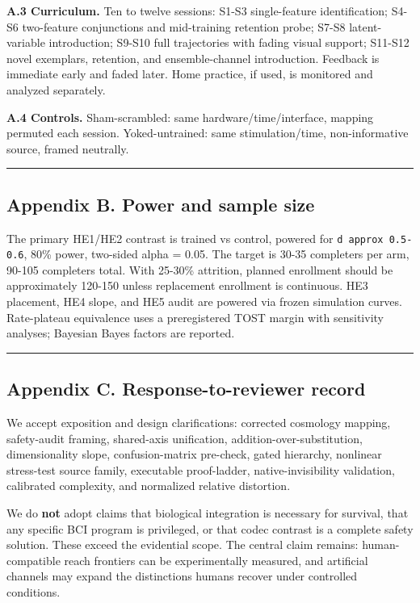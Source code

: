 \documentclass[
  11pt,
]{article}
\begin{document}
\textbf{A.3 Curriculum.} Ten to twelve sessions: S1-S3
single-feature identification; S4-S6 two-feature
conjunctions and mid-training retention probe; S7-S8
latent-variable introduction; S9-S10 full trajectories
with fading visual support; S11-S12 novel exemplars,
retention, and ensemble-channel introduction. Feedback
is immediate early and faded later. Home practice, if
used, is monitored and analyzed separately.

\textbf{A.4 Controls.} Sham-scrambled: same
hardware/time/interface, mapping permuted each session.
Yoked-untrained: same stimulation/time, non-informative
source, framed neutrally.

\begin{center}\rule{0.5\linewidth}{0.5pt}\end{center}

\subsection{Appendix B. Power and sample
size}\label{appendix-b.-power-and-sample-size}

The primary HE1/HE2 contrast is trained vs control,
powered for \texttt{d\ approx\ 0.5-0.6}, 80\% power,
two-sided alpha = 0.05. The target is 30-35 completers
per arm, 90-105 completers total. With 25-30\%
attrition, planned enrollment should be approximately
120-150 unless replacement enrollment is continuous.
HE3 placement, HE4 slope, and HE5 audit are powered via
frozen simulation curves. Rate-plateau equivalence uses
a preregistered TOST margin with sensitivity analyses;
Bayesian Bayes factors are reported.

\begin{center}\rule{0.5\linewidth}{0.5pt}\end{center}

\subsection{Appendix C. Response-to-reviewer
record}\label{appendix-c.-response-to-reviewer-record}

We accept exposition and design clarifications:
corrected cosmology mapping, safety-audit framing,
shared-axis unification, addition-over-substitution,
dimensionality slope, confusion-matrix pre-check, gated
hierarchy, nonlinear stress-test source family,
executable proof-ladder, native-invisibility
validation, calibrated complexity, and normalized
relative distortion.

We do \textbf{not} adopt claims that biological
integration is necessary for survival, that any
specific BCI program is privileged, or that codec
contrast is a complete safety solution. These exceed
the evidential scope. The central claim remains:
human-compatible reach frontiers can be experimentally
measured, and artificial channels may expand the
distinctions humans recover under controlled
conditions.
\end{document}
